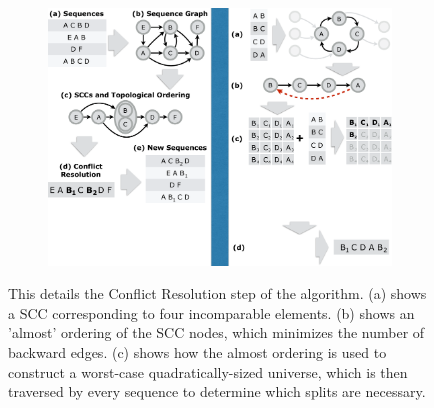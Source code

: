\begin{figure}[t!] 
\begin{minipage}{1\linewidth}
\begin{subfigure}[c]{0.96\linewidth}
\includegraphics[trim={19.2cm 10cm 0 0}, clip, width=\linewidth]{figures/partial_ordering}
\end{subfigure} 
\end{minipage} 
\caption{This details the Conflict Resolution step of the algorithm. (a) shows a SCC corresponding to four incomparable elements. (b) shows an 'almost' ordering of the SCC nodes, which minimizes the number of backward edges. (c) shows how the almost ordering is used to construct a worst-case quadratically-sized universe, which is then traversed by every sequence to determine which splits are necessary. }
\label{fig:conflict_res}
\end{figure}